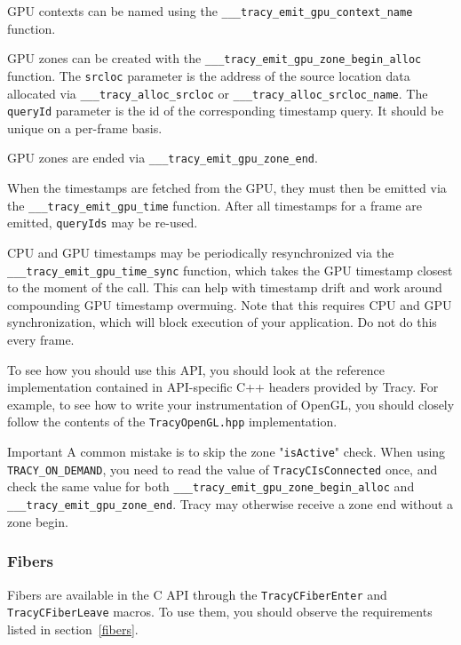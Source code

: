 \documentclass[hidelinks,titlepage,a4paper,twoside]{article}
\begin{document}
GPU contexts can be named using the \texttt{\_\_\_tracy\_emit\_gpu\_context\_name} function.

GPU zones can be created with the \texttt{\_\_\_tracy\_emit\_gpu\_zone\_begin\_alloc} function. The \texttt{srcloc} parameter is the address of the source location data allocated via \texttt{\_\_\_tracy\_alloc\_srcloc} or \texttt{\_\_\_tracy\_alloc\_srcloc\_name}. The \texttt{queryId} parameter is the id of the corresponding timestamp query. It should be unique on a per-frame basis.

GPU zones are ended via \texttt{\_\_\_tracy\_emit\_gpu\_zone\_end}.

When the timestamps are fetched from the GPU, they must then be emitted via the \texttt{\_\_\_tracy\_emit\_gpu\_time} function. After all timestamps for a frame are emitted, \texttt{queryIds} may be re-used.

CPU and GPU timestamps may be periodically resynchronized via the \texttt{\_\_\_tracy\_emit\_gpu\_time\_sync} function, which takes the GPU timestamp closest to the moment of the call. This can help with timestamp drift and work around compounding GPU timestamp overmuing. Note that this requires CPU and GPU synchronization, which will block execution of your application. Do not do this every frame.

To see how you should use this API, you should look at the reference implementation contained in API-specific C++ headers provided by Tracy. For example, to see how to write your instrumentation of OpenGL, you should closely follow the contents of the \texttt{TracyOpenGL.hpp} implementation.


\begin{bclogo}[
	noborder=true,
	couleur=black!5,
	logo=\bcbombe
	]{Important}
A common mistake is to skip the zone "\texttt{isActive}" check. When using \texttt{TRACY\_ON\_DEMAND}, you need to read the value of \texttt{TracyCIsConnected} once, and check the same value for both \newline \texttt{\_\_\_tracy\_emit\_gpu\_zone\_begin\_alloc} and \texttt{\_\_\_tracy\_emit\_gpu\_zone\_end}. Tracy may otherwise receive a zone end without a zone begin.
\end{bclogo}

\subsubsection{Fibers}

Fibers are available in the C API through the \texttt{TracyCFiberEnter} and \texttt{TracyCFiberLeave} macros. To use them, you should observe the requirements listed in section~\ref{fibers}.
\end{document}
